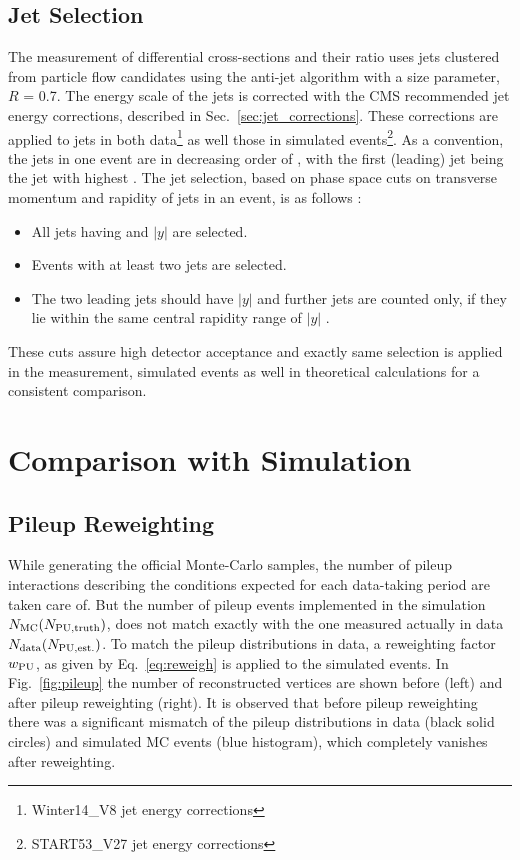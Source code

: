 \subsection{Jet Selection}
The measurement of differential cross-sections and their ratio uses jets clustered from particle flow candidates using the anti-\kt jet algorithm with a size parameter, $R$ = 0.7. The energy scale of the jets is corrected with the CMS recommended jet energy corrections, described in Sec.~\ref{sec:jet_corrections}. These corrections are applied to jets in both data\footnote{Winter14\_V8 jet energy corrections} as well those in simulated events\footnote{START53\_V27 jet energy corrections}. As a convention, the jets in one event are in decreasing order of \pt, with the first (leading) jet being the jet with highest \pt. The jet selection, based on phase space cuts on transverse momentum and rapidity of jets in an event, is as follows : 

\begin{itemize}
\item All jets having \pt {} \GeV and $|y|$  are selected.
\item Events with at least two jets are selected.
\item The two leading jets should have $|y|$  and further jets are counted only, if they lie within the same central rapidity range of $|y|$ . 
\end{itemize}

These cuts assure high detector acceptance and exactly same selection is applied in the measurement, simulated events as well in theoretical calculations for a consistent comparison. 

\section{Comparison with Simulation}
\subsection{Pileup Reweighting}
While generating the official Monte-Carlo samples, the number of pileup interactions describing the conditions expected for each data-taking period are taken care of. But the number of pileup events implemented in the simulation $N_{\rm MC} (N_{\rm PU,truth})$, does not match exactly with the one measured actually in data $N_{\rm data} (N_{\rm PU,est.})$. To match the pileup distributions in data, a reweighting factor $w_{\rm PU}$, as given by Eq.~\ref{eq:reweigh} is applied to the simulated events. In Fig.~\ref{fig:pileup} the number of reconstructed vertices are shown before (left) and after pileup reweighting (right). It is observed that before pileup reweighting there was a significant mismatch of the pileup distributions in data (black solid circles) and simulated MC events (blue histogram), which completely vanishes after reweighting. 

